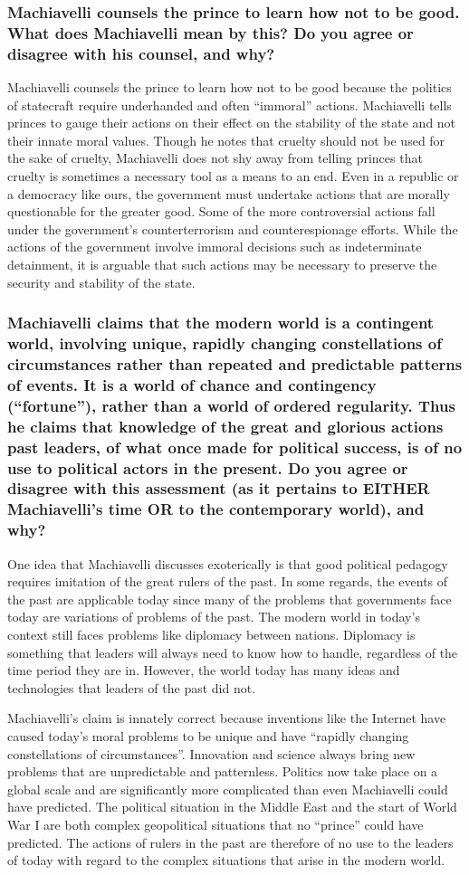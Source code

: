 \documentclass[letterpaper, 12pt]{article}
\begin{document}
\subsubsection*{Machiavelli counsels the prince to learn how not to be good.
What does Machiavelli mean by this? Do you agree or disagree with his counsel,
and why?}
Machiavelli counsels the prince to learn how not to be good because the politics of statecraft require underhanded and often ``immoral'' actions. Machiavelli tells princes to gauge their actions on their effect on the stability of the state and not their innate moral values. Though he notes that cruelty should not be used for the sake of cruelty, Machiavelli does not shy away from telling princes that cruelty is sometimes a necessary tool as a means to an end. Even in a republic or a democracy like ours, the government must undertake actions that are morally questionable for the greater good. Some of the more controversial actions fall under the government's counterterrorism and counterespionage efforts. While the actions of the government involve immoral decisions such as indeterminate detainment, it is arguable that such actions may be necessary to preserve the security and stability of the state.

\subsubsection*{Machiavelli claims that the modern world is a contingent world,
involving unique, rapidly changing constellations of circumstances rather than
repeated and predictable patterns of events. It is a world of chance and
contingency (``fortune''), rather than a world of ordered regularity. Thus he
claims that knowledge of the great and glorious actions past leaders, of what
once made for political success, is of no use to political actors in the
present. Do you agree or disagree with this assessment (as it pertains to
EITHER Machiavelli’s time OR to the contemporary world), and why?}
One idea that Machiavelli discusses exoterically is that good political pedagogy requires imitation of the great rulers of the past. In some regards, the events of the past are applicable today since many of the problems that governments face today are variations of problems of the past. The modern world in today's context still faces problems like diplomacy between nations. Diplomacy is something that leaders will always need to know how to handle, regardless of the time period they are in. However, the world today has many ideas and technologies that leaders of the past did not. \par
Machiavelli's claim is innately correct because inventions like the Internet have caused today's moral problems to be unique and have ``rapidly changing constellations of circumstances''. Innovation and science always bring new problems that are unpredictable and patternless. Politics now take place on a global scale and are significantly more complicated than even Machiavelli could have predicted. The political situation in the Middle East and the start of World War I are both complex geopolitical situations that no ``prince'' could have predicted. The actions of rulers in the past are therefore of no use to the leaders of today with regard to the complex situations that arise in the modern world.
\end{document}
